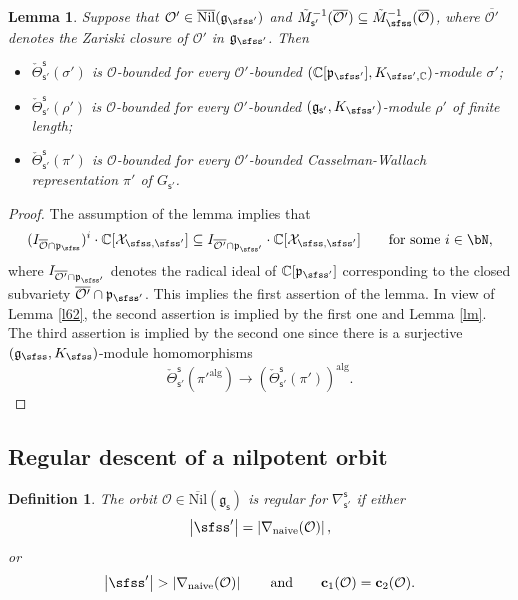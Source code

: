 \documentclass[11pt,a4paper]{amsart}
\def\abs#1{\left|{#1}\right|}
\newcommand{\CO}{{\mathcal {O}}}
\newcommand{\CX}{{\mathcal {X}}}
\newcommand{\g}{\mathfrak g}
\newcommand{\p}{\mathfrak p}
\def\DD{\nabla}
\numberwithin{equation}{section}
\newtheorem{lem}[thm]{Lemma}
\newtheorem{defn}[thm]{Definition}
\theoremstyle{remark}
\def\subset{\subseteq}
\def\Nil{\overline{\mathrm{Nil}}}
\begin{document}
\begin{lem}\label{comobound}
Suppose that $\CO'\in \Nil(\g_{\sfss'})$ and  $\tilde M_{\mathsf s'}^{-1}(\overline{\CO'})\subset \tilde M_{\sfss}^{-1}(\overline{\CO})$, where  $\overline{\CO'}$ denotes the Zariski closure of $\CO'$ in $\g_{\sfss'}$.  Then
\begin{itemize}
\item
$\check \Theta_{\mathsf s'}^{\mathsf s}(\sigma')$ is $\CO$-bounded for every $\CO'$-bounded $(\C[\p_{\sfss'}], K_{\sfss', \C})$-module $\sigma'$;
\item
 $\check \Theta_{\mathsf s'}^{\mathsf s}(\rho')$ is $\CO$-bounded for every $\CO'$-bounded $(\g_{\mathsf s'}, K_{\sfss'})$-module $\rho'$ of finite length;
 \item $\check \Theta_{\mathsf s'}^{\mathsf s}(\pi')$ is $\CO$-bounded for every $\CO'$-bounded Casselman-Wallach representation $\pi'$ of $G_{\mathsf s'}$.
 \end{itemize}
\end{lem}
\begin{proof} The assumption of the lemma implies  that
\[
 ( I_{\overline{\CO}\cap \p_\sfss})^i\cdot \C[\CX_{\sfss, \sfss'}] \subset I_{\overline{\CO'}\cap \p_{\sfss'}}\cdot  \C[\CX_{\sfss, \sfss'}]\qquad \textrm{for some } i\in \bN,
\]
where $I_{\overline{\CO'}\cap \p_{\sfss'}}$ denotes  the radical ideal of $\C[\p_{\sfss'}]$ corresponding to the closed subvariety $\overline{\CO'}\cap \p_{\sfss'}$.
This implies the first assertion of the lemma. In view of Lemma \ref{l62}, the second assertion is implied by the first one and Lemma \ref{lm}. The third assertion is implied by the second one since there is a surjective
$(\g_{\sfss}, K_{\sfss})$-module homomorphisms
\[
\check \Theta_{\mathsf s'}^{\mathsf s}(\pi'^{\mathrm{alg}})\rightarrow \left (\check \Theta_{\mathsf s'}^{\mathsf s}(\pi')\right )^{\mathrm{alg}}.
 \]
\end{proof}


\subsection{Regular descent of a nilpotent orbit}\label{regud}

\begin{defn}
The orbit $\CO\in \Nil(\g_\mathsf s)$ is regular for $\DD_{\mathsf s'}^{\mathsf s}$ if
either
\[
\abs{\sfss'}=\abs{\DD_\mathrm{naive}(\CO)},
\]
 or
 \[
 \abs{\sfss'}>\abs{\DD_\mathrm{naive}(\CO)}\qquad\textrm{and}\qquad \mathbf c_1(\CO)=\mathbf c_2(\CO).
\]

\end{defn}
\end{document}
